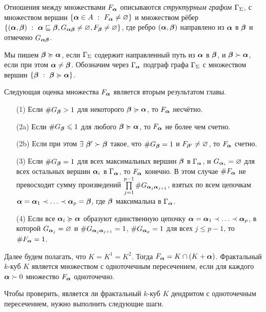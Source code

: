 Отношения между множествами $F_{\bm{\alpha}}$ описываются {\em структурным графом $\Gamma_\Sigma$}, с множеством вершин $\{{\bm{\alpha}}\in A\ :\ F_{\bm{\alpha}}\neq\varnothing\}$ и множеством рёбер $\{(\bma, \bmb)\ :\ \bma\sqsubseteq\bmb, G_{\bma\bmb}\neq\0, F_\bmb\neq\0\}$, где ребро $({\bm{\alpha}}, {\bm{\beta}})$ направлено из ${\bm{\alpha}}$ в ${\bm{\beta}}$ и отмечено $G_{{\bm{\alpha}}{\bm{\beta}}}$.

Мы пишем ${\bm{\beta}}\succcurlyeq{\bm{\alpha}}$, если  $\Gamma_\Sigma$ содержит направленный путь из ${\bm{\alpha}}$ в ${\bm{\beta}}$, и ${\bm{\beta}}\succ{\bm{\alpha}}$, если при этом ${\bm{\alpha}}\neq{\bm{\beta}}$.
Обозначим через $\Gamma_{\bm{\alpha}}$ подграф графа $\Gamma_\Sigma$ с множеством вершин $\{{\bm{\beta}}\ :\ {\bm{\beta}}\succcurlyeq{\bm{\alpha}}\}$. 
 
Следующая оценка множества $F_{\bm{\alpha}}$ является вторым результатом главы.\\

{\em \begin{enumerate}[nolistsep]
\item[(1)] Если $\#G_{\bm{\beta}}>1$ для некоторого ${\bm{\beta}}\succcurlyeq{\bm{\alpha}}$, то  $F_{\bm{\alpha}}$ несчётно.
\item[(2a)] Если  $\#G_{\bm{\beta}}\leqslant1$ для любого ${\bm{\beta}}\succcurlyeq{\bm{\alpha}}$, то  $F_{\bm{\alpha}}$ не более чем счетно.
\item[(2b)] Если при этом $\exists\ {\bm{\beta}}'\succ{\bm{\beta}}$ такое, что $\#G_{\bm{\beta}}=1$ и $F_{{\bm{\beta}}'}\neq\varnothing$, то $F_{\bm{\alpha}}$ счетно.
\item[(3)] Если  $\#G_{\bm{\beta}}=1$ для всех максимальных вершин ${\bm{\beta}}$ в $\Gamma_{\bm{\alpha}}$, и $G_{{\bm{\alpha}}_i}=\varnothing$ для всех остальных вершин ${\bm{\alpha}}_i$ в $\Gamma_{\bm{\alpha}}$, то $F_{\bm{\alpha}}$ конечно.
В этом случае $\#F_{\bm{\alpha}}$ не превосходит сумму произведений $\prod \limits_{j=1}^{p-1}\# G_{{\bm{\alpha}}_j{\bm{\alpha}}_{j+1}}$, взятых по всем цепочкам ${\bm{\alpha}}={\bm{\alpha}}_1\prec\ldots\prec{\bm{\alpha}}_p={\bm{\beta}}$, где ${\bm{\beta}}$  максимальна в $\Gamma_{\bm{\alpha}}$.
\item[(4)] Если все ${\bm{\alpha}}_i\succcurlyeq{\bm{\alpha}}$ образуют единственную цепочку ${\bm{\alpha}}={\bm{\alpha}}_1\prec\ldots\prec{\bm{\alpha}}_p$, в которой $G_{{\bm{\alpha}}_j}=\varnothing$ и $\# G_{{\bm{\alpha}}_j{\bm{\alpha}}_{j+1}}=1$, $\#G_{{\bm{\alpha}}_p}=1$ для всех $j\le p-1$, то $\#F_{\bm{\alpha}}=1$.
\end{enumerate} \quad}

Далее будем полагать, что $K=K^1=K^2$.
Тогда $F_{\bm{\alpha}}=K\cap(K+{\bm{\alpha}})$.
Фрактальный $k$-куб $K$ является множеством с одноточечным пересечением, если для каждого ${\bm{\alpha}}\succ0$ множество $F_{\bm{\alpha}}$ одноточечно.

Чтобы проверить, является ли фрактальный $k$-куб $K$ дендритом с одноточечным пересечением, нужно выполнить следующие шаги.\\

